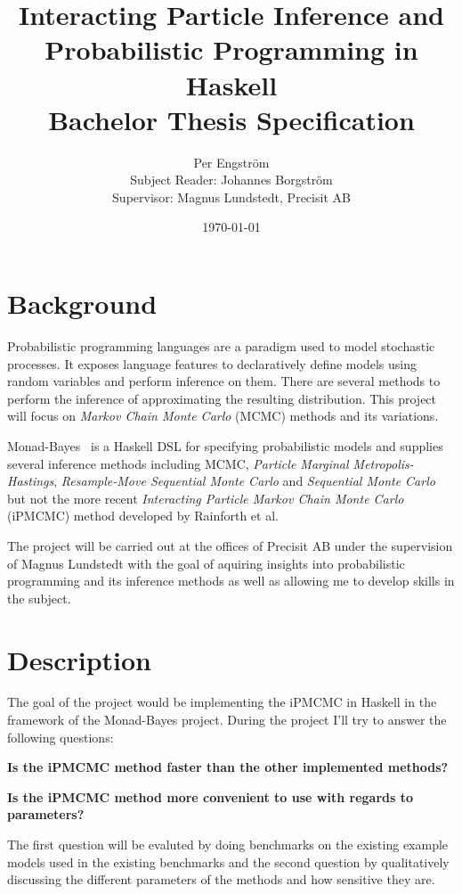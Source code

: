 \documentclass[a4paper, parskip]{scrartcl}
\title{Interacting Particle Inference and Probabilistic Programming in Haskell\\ \normalfont
\Large Bachelor Thesis Specification}
\author{Per Engström \\ \small Subject Reader: Johannes Borgström \\ \small Supervisor:
  Magnus Lundstedt, Precisit AB}
\date{\today}
\begin{document}
\maketitle

\section{Background}
\label{sec:background}

Probabilistic programming languages are a paradigm used to model stochastic
processes. It exposes language features to declaratively define models using
random variables and perform inference on them. There are several methods to
perform the inference of approximating the resulting distribution. This project
will focus on \emph{Markov Chain Monte Carlo} (MCMC) methods and its variations.

Monad-Bayes~\cite{hbayes} is a Haskell DSL for specifying probabilistic models and supplies
several inference methods including MCMC, \emph{Particle Marginal
Metropolis-Hastings}, \emph{Resample-Move Sequential Monte Carlo} and
\emph{Sequential Monte Carlo} but not the more recent \emph{Interacting
Particle Markov Chain Monte Carlo} (iPMCMC) method developed by Rainforth et al.~\cite{rainforth}

The project will be carried out at the offices of Precisit AB under the
supervision of Magnus Lundstedt with the goal of aquiring insights into
probabilistic programming and its inference methods as well as allowing me to
develop skills in the subject.

\section{Description}
\label{sec:description}

The goal of the project would be implementing the iPMCMC in Haskell in the
framework of the Monad-Bayes project. During the project I'll try to answer the following questions:

\textbf{Is the iPMCMC method faster than the other implemented methods?}

\textbf{Is the iPMCMC method more convenient to use with regards to parameters?}

The first question will be evaluted by doing benchmarks on the existing example
models used in the existing benchmarks and the second question by qualitatively
discussing the different parameters of the methods and how sensitive they are.
\end{document}
